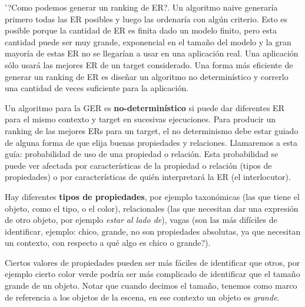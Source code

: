 '?Como podemos generar un ranking de ER?.
Un algoritmo naive generar\'ia primero todas las ER posibles y luego las ordenar\'ia con alg\'un criterio. Esto es posible porque la cantidad de ER es finita dado un modelo finito, pero esta cantidad puede ser muy grande, exponencial en el tama\~{n}o del modelo y la gran mayor\'ia de estas ER no se llegar\'ian a usar en una aplicaci\'on real. Una aplicaci\'on s\'olo usar\'a las mejores ER de un target considerado.
Una forma m\'as eficiente de generar un ranking de ER es dise\~{n}ar un algoritmo no determin\'istico y correrlo una cantidad de veces suficiente para la aplicaci\'on.

Un algoritmo para la GER es {\bf no-determin\'istico} si puede dar diferentes ER para el mismo contexto y target en sucesivas ejecuciones. 
Para producir un ranking de las mejores ERs para un target, el no determinismo debe estar guiado de alguna forma de que elija buenas propiedades y relaciones. Llamaremos a esta gu\'ia: probabilidad de uso de una propiedad o relaci\'on. Esta probabilidad se puede ver afectada por caracter\'isticas de la propiedad o relaci\'on (tipos de propiedades) o por caracter\'isticas de qui\'en interpretar\'a la ER (el interlocutor).

Hay diferentes \textbf{tipos de propiedades}, por ejemplo taxon\'omicas (las que tiene el objeto, como el tipo, o el color), relacionales (las que necesitan dar una expresi\'on de otro objeto, por ejemplo {\it estar al lado de}), vagas (son las m\'as dif\'iciles de identificar, ejemplo: chico, grande, no son propiedades absolutas, ya que necesitan un contexto, con respecto a qu\'e algo es chico o grande?).

Ciertos valores de propiedades pueden ser m\'as f\'aciles de identificar que otros, por ejemplo cierto color verde podr\'{i}a ser m\'as complicado de identificar que el tama\~no grande de un objeto. Notar que cuando decimos el tama\~no, tenemos como marco de referencia a los objetos de la escena, en ese contexto un objeto es {\it grande}.

